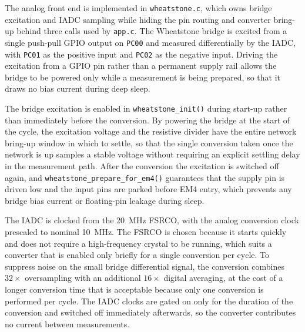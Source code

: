 The analog front end is implemented in \texttt{wheatstone.c}, which owns bridge excitation and IADC sampling while hiding the pin routing and converter bring-up behind three calls used by \texttt{app.c}.
The Wheatstone bridge is excited from a single push-pull GPIO output on \texttt{PC00} and measured differentially by the IADC, with \texttt{PC01} as the positive input and \texttt{PC02} as the negative input.
Driving the excitation from a GPIO pin rather than a permanent supply rail allows the bridge to be powered only while a measurement is being prepared, so that it draws no bias current during deep sleep.

The bridge excitation is enabled in \texttt{wheatstone\_init()} during start-up rather than immediately before the conversion.
By powering the bridge at the start of the cycle, the excitation voltage and the resistive divider have the entire network bring-up window in which to settle, so that the single conversion taken once the network is up samples a stable voltage without requiring an explicit settling delay in the measurement path.
After the conversion the excitation is switched off again, and \texttt{wheatstone\_prepare\_for\_em4()} guarantees that the supply pin is driven low and the input pins are parked before EM4 entry, which prevents any bridge bias current or floating-pin leakage during sleep.

The IADC is clocked from the \SI{20}{\mega\hertz} FSRCO, with the analog conversion clock prescaled to nominal \SI{10}{\mega\hertz}.
The FSRCO is chosen because it starts quickly and does not require a high-frequency crystal to be running, which suits a converter that is enabled only briefly for a single conversion per cycle.
To suppress noise on the small bridge differential signal, the conversion combines $\num{32}\times$ oversampling with an additional $\num{16}\times$ digital averaging, at the cost of a longer conversion time that is acceptable because only one conversion is performed per cycle.
The IADC clocks are gated on only for the duration of the conversion and switched off immediately afterwards, so the converter contributes no current between measurements.

